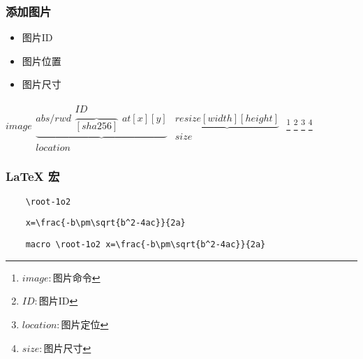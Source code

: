\subsubsection{添加图片}
\begin{itemize}
    \item 图片ID
    \item 图片位置
    \item 图片尺寸
\end{itemize}
\begin{math}
    image
    \begin{matrix}
        \underbrace{
            abs/rwd \begin{matrix}
                        ID \\ \overbrace{[sha256]}
                    \end{matrix} at [x] [y]
        } \\ location
    \end{matrix}
    \begin{matrix}
        \underbrace{resize [width] [height]} \\ size
    \end{matrix}
\end{math}
\footnote{$image: $图片命令}
\footnote{$ID: $图片ID}
\footnote{$location: $图片定位}
\footnote{$size: $图片尺寸}

\subsubsection{\LaTeX
    宏}
\begin{lstlisting}
    \root-1o2
\end{lstlisting}
\begin{lstlisting}
    x=\frac{-b\pm\sqrt{b^2-4ac}}{2a}
\end{lstlisting}
\begin{lstlisting}
    macro \root-1o2 x=\frac{-b\pm\sqrt{b^2-4ac}}{2a}
\end{lstlisting}
